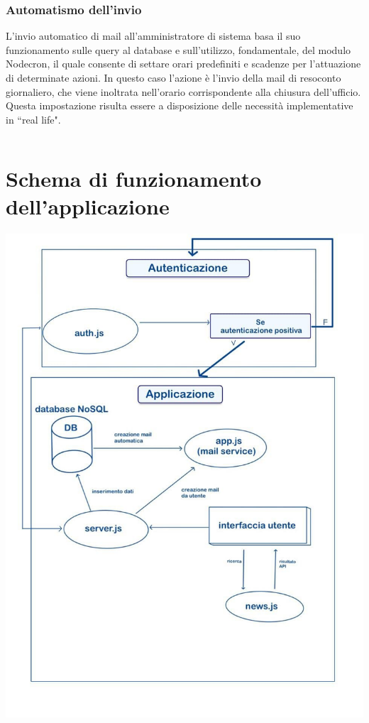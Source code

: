 \begin{flushleft}
\subsubsection{Automatismo dell'invio}
L'invio automatico di mail all'amministratore di sistema basa il suo funzionamento sulle query al database e sull'utilizzo, fondamentale, del modulo Nodecron, il quale consente di settare orari predefiniti e scadenze per l'attuazione di determinate azioni.
In questo caso l'azione è l'invio della mail di resoconto giornaliero, che viene inoltrata nell'orario corrispondente alla chiusura dell'ufficio. \\
Questa impostazione risulta essere a disposizione delle necessità implementative in  ``real life".\\

\begin{lstlisting}
\end{lstlisting}
\end{flushleft}
\section{Schema di funzionamento dell'applicazione}
{\includegraphics[width= 0.7 \textwidth]{img/schema.jpg}}\\
\newpage
